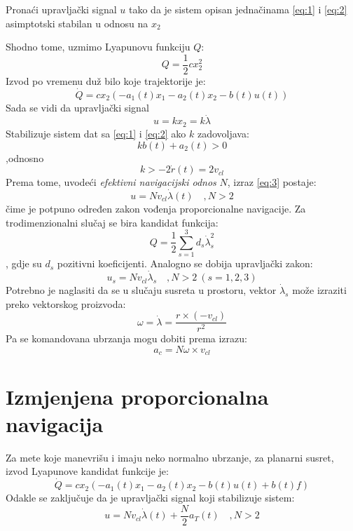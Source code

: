 \begin{tcolorbox}
    Pronaći upravljački signal $u$ tako da je sistem opisan jednačinama \ref{eq:1} i \ref{eq:2} asimptotski stabilan u odnosu na $x_2$
\end{tcolorbox}
Shodno tome, uzmimo Lyapunovu funkciju $Q$:
\begin{equation}
    Q=\frac{1}{2}cx_2^2
\end{equation}
Izvod po vremenu duž bilo koje trajektorije je:
\begin{equation}
    \dot{Q}=cx_2(-a_1(t)x_1-a_2(t)x_2-b(t)u(t))
\end{equation}
Sada se vidi da upravljački signal 
\begin{equation}
    u=kx_2=k\dot{\lambda}
    \label{eq:3}
\end{equation}
Stabilizuje sistem dat sa \ref{eq:1} i \ref{eq:2} ako $k$ zadovoljava:
\begin{equation}
    kb(t)+a_2(t)>0
\end{equation}
,odnosno \begin{equation}
    k>-2\dot{r}(t)=2v_{cl}
\end{equation}
Prema tome, uvodeći \textit{efektivni navigacijski odnos} $N$, izraz \ref{eq:3} postaje:
\begin{equation}
    u=Nv_{cl}\dot{\lambda}(t) \quad ,N>2
\end{equation}
čime je potpuno određen zakon vođenja proporcionalne navigacije.
Za trodimenzionalni slučaj se bira kandidat funkcija:
\begin{equation}
    Q=\frac{1}{2}\sum_{s=1}^3d_s\dot{\lambda}_s^2
\end{equation}
, gdje su $d_s$ pozitivni koeficijenti. Analogno se dobija upravljački zakon:
\begin{equation}
    u_s=Nv_{cl}\dot{\lambda}_s \quad ,N>2\ (s=1,2,3)
\end{equation}
Potrebno je naglasiti da se u slučaju susreta u prostoru, vektor $\dot{\lambda}_s$ može 
izraziti preko vektorskog proizvoda:
\begin{equation}
    \omega = \dot{\lambda}=\frac{r\times (-v_{cl})}{r^2}
    \label{eq:vec1}
\end{equation}
Pa se komandovana ubrzanja mogu dobiti prema izrazu:
\begin{equation}
    a_c = N\omega \times v_{cl}
    \label{eq:vec2}
\end{equation}
\section{Izmjenjena proporcionalna navigacija}
Za mete koje manevrišu i imaju neko normalno ubrzanje, za planarni susret, izvod Lyapunove kandidat 
funkcije je:
\begin{equation}
    \dot{Q}=cx_2(-a_1(t)x_1-a_2(t)x_2-b(t)u(t)+b(t)f)
\end{equation}
Odakle se zaključuje da je upravljački signal koji stabilizuje sistem:
\begin{equation}
    u=Nv_{cl}\dot{\lambda}(t)+\frac{N}{2}a_T(t) \quad ,N>2
\end{equation}
